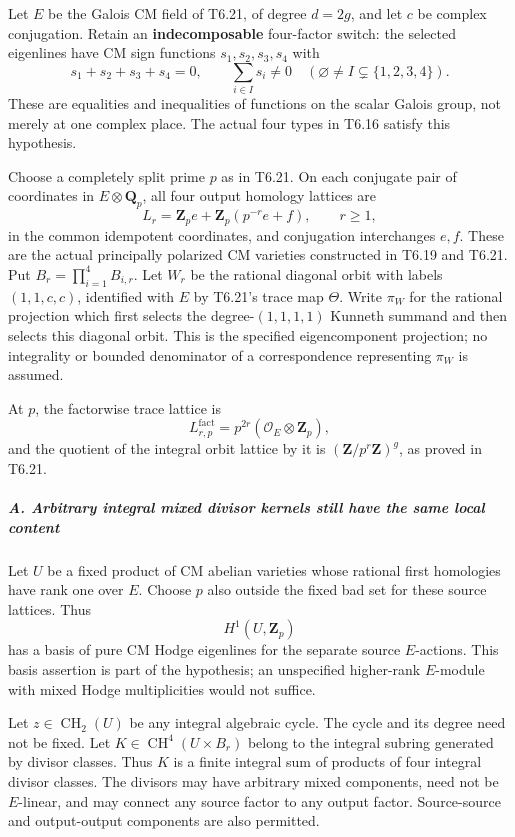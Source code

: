 Let \(E\) be the Galois CM field of T6.21, of degree \(d=2g\), and let \(c\) be complex conjugation. Retain an \textbf{indecomposable} four-factor switch: the selected eigenlines have CM sign functions \(s_1,s_2,s_3,s_4\) with \[
 s_1+s_2+s_3+s_4=0,
 \qquad
 \sum_{i\in I}s_i\ne0
 \quad(\varnothing\ne I\subsetneq\{1,2,3,4\}).
 \tag{T22.1}
\] These are equalities and inequalities of functions on the scalar Galois group, not merely at one complex place. The actual four types in T6.16 satisfy this hypothesis.

Choose a completely split prime \(p\) as in T6.21. On each conjugate pair of coordinates in \(E\otimes\mathbf Q_p\), all four output homology lattices are \[
 L_r=\mathbf Z_p e+\mathbf Z_p(p^{-r}e+f),
 \qquad r\ge1,
 \tag{T22.2}
\] in the common idempotent coordinates, and conjugation interchanges \(e,f\). These are the actual principally polarized CM varieties constructed in T6.19 and T6.21. Put \(B_r=\prod_{i=1}^4B_{i,r}\). Let \(W_r\) be the rational diagonal orbit with labels \((1,1,c,c)\), identified with \(E\) by T6.21's trace map \(\Theta\). Write \(\pi_W\) for the rational projection which first selects the degree-\((1,1,1,1)\) Kunneth summand and then selects this diagonal orbit. This is the specified eigencomponent projection; no integrality or bounded denominator of a correspondence representing \(\pi_W\) is assumed.

At \(p\), the factorwise trace lattice is \[
 L^{\mathrm{fact}}_{r,p}=p^{2r}(\mathcal O_E\otimes\mathbf Z_p),
 \tag{T22.3}
\] and the quotient of the integral orbit lattice by it is \((\mathbf Z/p^r\mathbf Z)^g\), as proved in T6.21.

\subparagraph{A. Arbitrary integral mixed divisor kernels still have the same local content}\label{a.-arbitrary-integral-mixed-divisor-kernels-still-have-the-same-local-content}

Let \(U\) be a fixed product of CM abelian varieties whose rational first homologies have rank one over \(E\). Choose \(p\) also outside the fixed bad set for these source lattices. Thus \[
 H^1(U,\mathbf Z_p)
\] has a basis of pure CM Hodge eigenlines for the separate source \(E\)-actions. This basis assertion is part of the hypothesis; an unspecified higher-rank \(E\)-module with mixed Hodge multiplicities would not suffice.

Let \(z\in\operatorname{CH}_2(U)\) be any integral algebraic cycle. The cycle and its degree need not be fixed. Let \(K\in\operatorname{CH}^4(U\times B_r)\) belong to the integral subring generated by divisor classes. Thus \(K\) is a finite integral sum of products of four integral divisor classes. The divisors may have arbitrary mixed components, need not be \(E\)-linear, and may connect any source factor to any output factor. Source-source and output-output components are also permitted.

